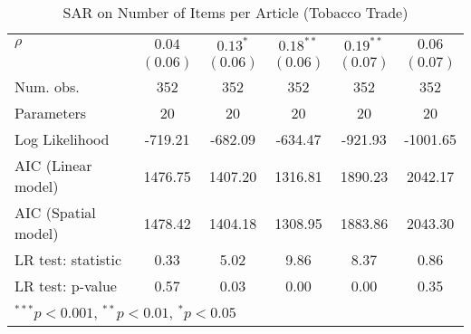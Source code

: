 \begin{table}[!h]
\begin{center}
\begin{tabular}{l c c c c c }
$\rho$                  & $0.04$       & $0.13^{*}$   & $0.18^{**}$  & $0.19^{**}$  & $0.06$       \\
                        & $(0.06)$     & $(0.06)$     & $(0.06)$     & $(0.07)$     & $(0.07)$     \\
\midrule
Num. obs.               & 352          & 352          & 352          & 352          & 352          \\
Parameters              & 20           & 20           & 20           & 20           & 20           \\
Log Likelihood          & -719.21      & -682.09      & -634.47      & -921.93      & -1001.65     \\
AIC (Linear model)      & 1476.75      & 1407.20      & 1316.81      & 1890.23      & 2042.17      \\
AIC (Spatial model)     & 1478.42      & 1404.18      & 1308.95      & 1883.86      & 2043.30      \\
LR test: statistic      & 0.33         & 5.02         & 9.86         & 8.37         & 0.86         \\
LR test: p-value        & 0.57         & 0.03         & 0.00         & 0.00         & 0.35         \\
\bottomrule
\multicolumn{6}{l}{\scriptsize{$^{***}p<0.001$, $^{**}p<0.01$, $^*p<0.05$}}
\end{tabular}
\caption{SAR on Number of Items per Article (Tobacco Trade)}
\label{table:coefficients}
\end{center}
\end{table}
